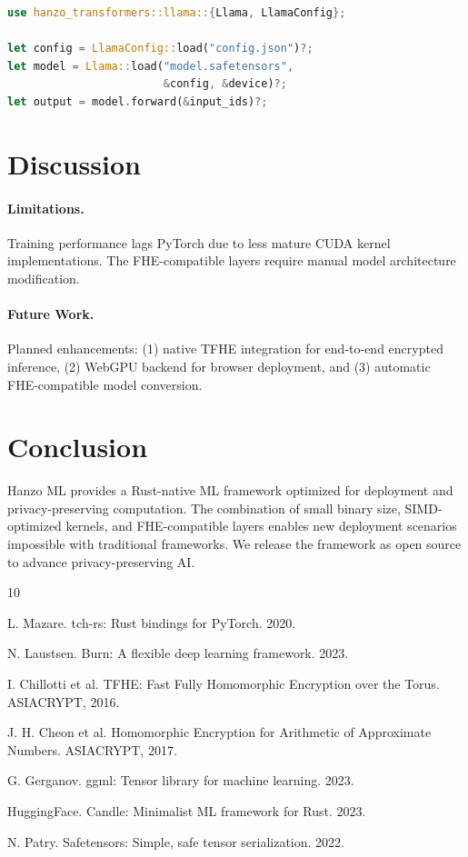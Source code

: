 \documentclass[11pt,twocolumn]{article}
\begin{document}
\begin{lstlisting}[language=Rust]
use hanzo_transformers::llama::{Llama, LlamaConfig};

let config = LlamaConfig::load("config.json")?;
let model = Llama::load("model.safetensors",
                        &config, &device)?;
let output = model.forward(&input_ids)?;
\end{lstlisting}

\section{Discussion}

\paragraph{Limitations.} Training performance lags PyTorch due to less mature CUDA kernel implementations. The FHE-compatible layers require manual model architecture modification.

\paragraph{Future Work.} Planned enhancements: (1) native TFHE integration for end-to-end encrypted inference, (2) WebGPU backend for browser deployment, and (3) automatic FHE-compatible model conversion.

\section{Conclusion}

Hanzo ML provides a Rust-native ML framework optimized for deployment and privacy-preserving computation. The combination of small binary size, SIMD-optimized kernels, and FHE-compatible layers enables new deployment scenarios impossible with traditional frameworks. We release the framework as open source to advance privacy-preserving AI.


\begin{thebibliography}{10}

L. Mazare. tch-rs: Rust bindings for PyTorch. 2020.

N. Laustsen. Burn: A flexible deep learning framework. 2023.

I. Chillotti et al. TFHE: Fast Fully Homomorphic Encryption over the Torus. ASIACRYPT, 2016.

J. H. Cheon et al. Homomorphic Encryption for Arithmetic of Approximate Numbers. ASIACRYPT, 2017.

G. Gerganov. ggml: Tensor library for machine learning. 2023.

HuggingFace. Candle: Minimalist ML framework for Rust. 2023.

N. Patry. Safetensors: Simple, safe tensor serialization. 2022.

\end{thebibliography}
\end{document}

